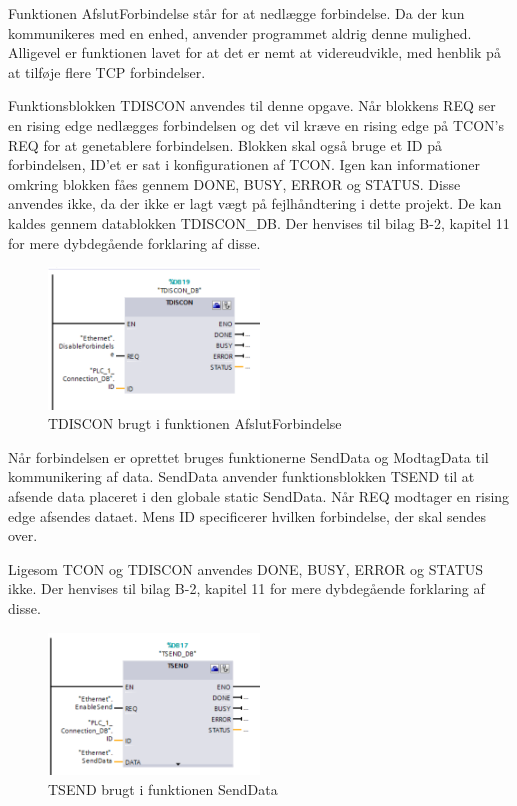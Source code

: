 Funktionen AfslutForbindelse står for at nedlægge forbindelse. Da der kun kommunikeres med en enhed, anvender programmet aldrig denne mulighed. Alligevel er funktionen lavet for at det er nemt at videreudvikle, med henblik på at tilføje flere TCP forbindelser. 

Funktionsblokken TDISCON anvendes til denne opgave. Når blokkens REQ ser en rising edge nedlægges forbindelsen og det vil kræve en rising edge på TCON's REQ for at genetablere forbindelsen. Blokken skal også bruge et ID på forbindelsen, ID'et er sat i konfigurationen af TCON. Igen kan informationer omkring blokken fåes gennem DONE, BUSY, ERROR og STATUS. Disse anvendes ikke, da der ikke er lagt vægt på fejlhåndtering i dette projekt. De kan kaldes gennem datablokken TDISCON\_DB. Der henvises til bilag B-2, kapitel 11 for mere dybdegående forklaring af disse.

\begin{figure}[H] %
	\centering
	\includegraphics[width=0.5\textwidth]{Figure/TDISCON}
	\caption{TDISCON brugt i funktionen AfslutForbindelse}
	\label{fig:TDISCON}
\end{figure}

Når forbindelsen er oprettet bruges funktionerne SendData og ModtagData til  kommunikering af data. SendData anvender funktionsblokken TSEND til at afsende data placeret i den globale static SendData. Når REQ modtager en rising edge afsendes dataet. Mens ID specificerer hvilken forbindelse, der skal sendes over.

Ligesom TCON og TDISCON anvendes DONE, BUSY, ERROR og STATUS ikke. Der henvises til bilag B-2, kapitel 11 for mere dybdegående forklaring af disse.

\begin{figure}[H] %
	\centering
	\includegraphics[width=0.5\textwidth]{Figure/TSEND}
	\caption{TSEND brugt i funktionen SendData}
	\label{fig:TSEND}
\end{figure}

